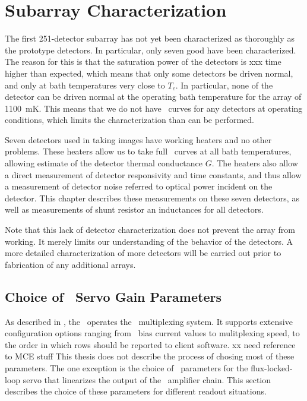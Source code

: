 \chapter{Subarray Characterization}\label{c:det-array}

The first 251-detector subarray has not yet been characterized as thoroughly as the prototype detectors.
In particular, only seven good have been characterized.
The reason for this is that the saturation power of the detectors is xxx time higher than expected, which means that only some detectors be driven normal, and only at bath temperatures very close to $T_c$.
In particular, none of the detector can be driven normal at the operating bath temperature for the array of 1100~mK.
This means that we do not have \IV\ curves for any detectors at operating conditions, which limits the characterization than can be performed.

Seven detectors used in taking images have working heaters and no other problems.
These heaters allow us to take full \IV\ curves at all bath temperatures, allowing estimate of the detector thermal conductance $G$.
The heaters also allow a direct measurement of detector responsivity and time constants, and thus allow a measurement of detector noise referred to optical power incident on the detector.
This chapter describes these measurements on these seven detectors, as well as measurements of shunt resistor an inductances for all detectors.

Note that this lack of detector characterization does not prevent the array from working.
It merely limits our understanding of the behavior of the detectors.
A more detailed characterization of more detectors will be carried out prior to fabrication of any additional arrays.

\section{Choice of \MCE\ Servo Gain Parameters}

As described in , the \MCE\ operates the \SQUID\ multiplexing system.
It supports extensive configuration options ranging from \SQUID\ bias current values to mulitplexing speed, to the order in which rows should be reported to client software. xx need reference to MCE stuff
This thesis does not describe the process of chosing most of these parameters.
The one exception is the choice of \PID\ parameters for the flux-locked-loop servo that linearizes the output of the \SQUID\ amplifier chain.
This section describes the choice of these parameters for different readout situations.

